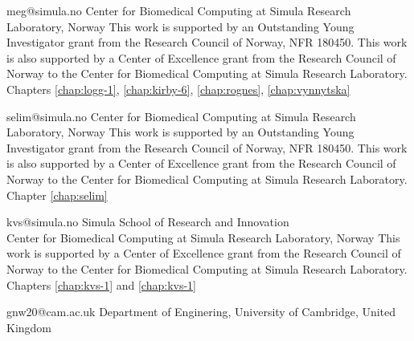              {meg@simula.no}
             {Center for Biomedical Computing at Simula Research Laboratory, Norway}
             {This work is supported by an Outstanding Young
              Investigator grant from the Research Council of Norway,
              NFR 180450. This work is also supported by a Center of
              Excellence grant from the Research Council of Norway to
              the Center for Biomedical Computing at Simula Research
              Laboratory.}
             {Chapters
              \ref{chap:logg-1}, \ref{chap:kirby-6}, \ref{chap:rognes}, \ref{chap:vynnytska}}



             {selim@simula.no}
             {Center for Biomedical Computing at Simula Research Laboratory, Norway}
             {This work is supported by an Outstanding Young
              Investigator grant from the Research Council of Norway,
              NFR 180450. This work is also supported by a Center of
              Excellence grant from the Research Council of Norway to
              the Center for Biomedical Computing at Simula Research
              Laboratory.}
             {Chapter \ref{chap:selim}}




             {kvs@simula.no}
             {Simula School of Research and Innovation \\
              Center for Biomedical Computing at Simula Research Laboratory, Norway}
             {This work is supported by a Center of Excellence grant
              from the Research Council of Norway to the Center for
              Biomedical Computing at Simula Research Laboratory.}
             {Chapters \ref{chap:kvs-1} and \ref{chap:kvs-1}}


             {gnw20@cam.ac.uk}
             {Department of Enginering, University of Cambridge, United Kingdom}
             {}
             {}


